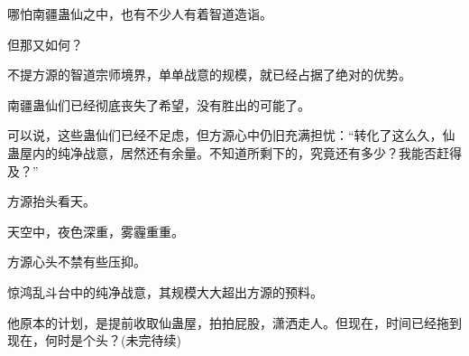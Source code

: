 \begin{this_body}
哪怕南疆蛊仙之中，也有不少人有着智道造诣。

但那又如何？

不提方源的智道宗师境界，单单战意的规模，就已经占据了绝对的优势。

南疆蛊仙们已经彻底丧失了希望，没有胜出的可能了。

可以说，这些蛊仙们已经不足虑，但方源心中仍旧充满担忧：“转化了这么久，仙蛊屋内的纯净战意，居然还有余量。不知道所剩下的，究竟还有多少？我能否赶得及？”

方源抬头看天。

天空中，夜色深重，雾霾重重。

方源心头不禁有些压抑。

惊鸿乱斗台中的纯净战意，其规模大大超出方源的预料。

他原本的计划，是提前收取仙蛊屋，拍拍屁股，潇洒走人。但现在，时间已经拖到现在，何时是个头？(未完待续)

\end{this_body}

